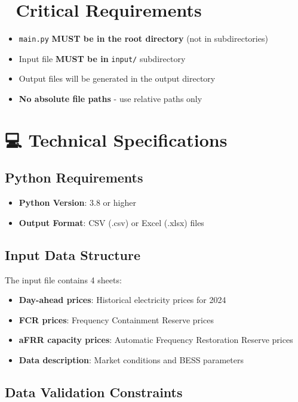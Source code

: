 \documentclass[11pt,a4paper]{article}
\begin{document}
\section*{🚨 Critical Requirements}

\begin{itemize}
    \item \texttt{main.py} \textbf{MUST be in the root directory} (not in subdirectories)
    \item Input file \textbf{MUST be in} \texttt{input/} subdirectory
    \item Output files will be generated in the output directory
    \item \textbf{No absolute file paths} - use relative paths only
\end{itemize}

\section*{💻 Technical Specifications}

\subsection*{Python Requirements}

\begin{itemize}
    \item \textbf{Python Version}: 3.8 or higher
    \item \textbf{Output Format}: CSV (.csv) or Excel (.xlsx) files
\end{itemize}

\subsection*{Input Data Structure}

The input file contains 4 sheets:

\begin{itemize}
    \item \textbf{Day-ahead prices}: Historical electricity prices for 2024
    \item \textbf{FCR prices}: Frequency Containment Reserve prices
    \item \textbf{aFRR capacity prices}: Automatic Frequency Restoration Reserve prices
    \item \textbf{Data description}: Market conditions and BESS parameters
\end{itemize}

\subsection*{Data Validation Constraints}
\end{document}
